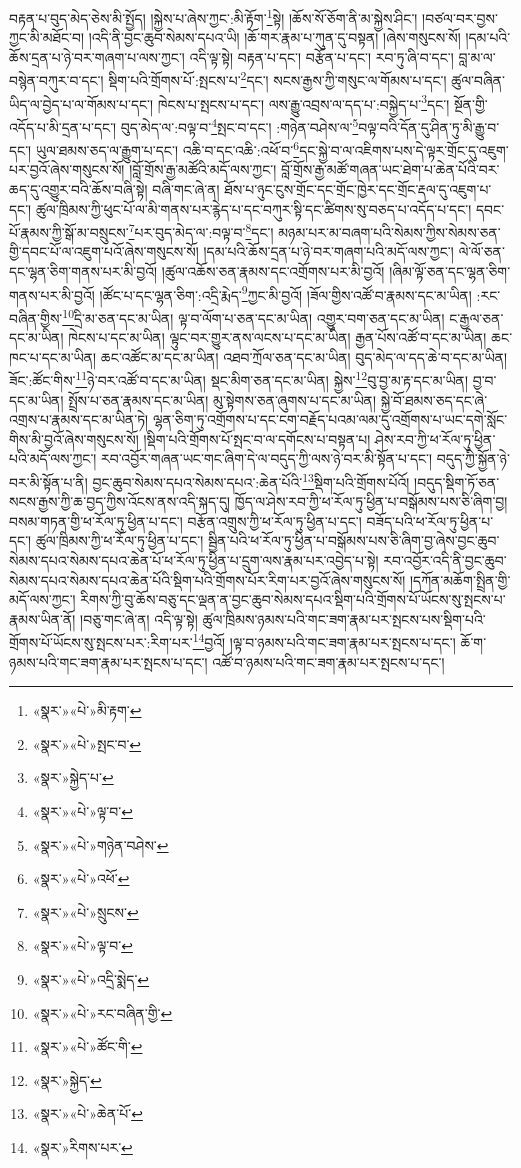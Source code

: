 བརྟན་པ་བུད་མེད་ཅེས་མི་སྤྱོད། །སྐྱེས་པ་ཞེས་ཀྱང་:མི་རྟོག་\footnote{«སྣར་»«པེ་»མི་རྟག་}སྟེ། །ཆོས་སོ་ཅོག་ནི་མ་སྐྱེས་ཤིང་། །བཙལ་བར་བྱས་ཀྱང་མི་མཐོང་བ། །འདི་ནི་བྱང་ཆུབ་སེམས་དཔའ་ཡི། །ཆོ་གར་རྣམ་པ་ཀུན་དུ་བསྟན། །ཞེས་གསུངས་སོ། །དམ་པའི་ཆོས་དྲན་པ་ཉེ་བར་གཞག་པ་ལས་ཀྱང་། འདི་ལྟ་སྟེ། བརྟན་པ་དང་། བརྩོན་པ་དང་། རབ་ཏུ་ཞི་བ་དང་། བླ་མ་ལ་བསྙེན་བཀུར་བ་དང་། སྡིག་པའི་གྲོགས་པོ་:སྤངས་པ་\footnote{«སྣར་»«པེ་»སྤང་བ་}དང་། སངས་རྒྱས་ཀྱི་གསུང་ལ་གོམས་པ་དང་། ཚུལ་བཞིན་ཡིད་ལ་བྱེད་པ་ལ་གོམས་པ་དང་། ཁེངས་པ་སྤངས་པ་དང་། ལས་རྒྱུ་འབྲས་ལ་དད་པ་:བསྐྱེད་པ་\footnote{«སྣར་»སྐྱེད་པ་}དང་། སྔོན་གྱི་འདོད་པ་མི་དྲན་པ་དང་། བུད་མེད་ལ་:བལྟ་བ་\footnote{«སྣར་»«པེ་»ལྟ་བ་}སྤང་བ་དང་། :གཉེན་བཤེས་ལ་\footnote{«སྣར་»«པེ་»གཉེན་བཤེས་}བལྟ་བའི་དོན་དུ་ཤིན་ཏུ་མི་རྒྱུ་བ་དང་། ཡུལ་ཐམས་ཅད་ལ་རྒྱུག་པ་དང་། འཆི་བ་དང་འཆི་:འཕོ་བ་\footnote{«སྣར་»«པེ་»འཕོ་}དང་སྐྱེ་བ་ལ་འཇིགས་པས་དེ་ལྟར་གྲོང་དུ་འཇུག་པར་བྱའོ་ཞེས་གསུངས་སོ། །བློ་གྲོས་རྒྱ་མཚོའི་མདོ་ལས་ཀྱང་། བློ་གྲོས་རྒྱ་མཚོ་གཞན་ཡང་ཐེག་པ་ཆེན་པོའི་བར་ཆད་དུ་འགྱུར་བའི་ཆོས་བཞི་སྟེ། བཞི་གང་ཞེ་ན། ཐོས་པ་ཉུང་ངུས་གྲོང་དང་གྲོང་ཁྱེར་དང་གྲོང་རྡལ་དུ་འཇུག་པ་དང་། ཚུལ་ཁྲིམས་ཀྱི་ཕུང་པོ་ལ་མི་གནས་པར་རྙེད་པ་དང་བཀུར་སྟི་དང་ཚིགས་སུ་བཅད་པ་འདོད་པ་དང་། དབང་པོ་རྣམས་ཀྱི་སྒོ་མ་བསྲུངས་\footnote{«སྣར་»«པེ་»སྲུངས་}པར་བུད་མེད་ལ་:བལྟ་བ་\footnote{«སྣར་»«པེ་»ལྟ་བ་}དང་། མཉམ་པར་མ་བཞག་པའི་སེམས་ཀྱིས་སེམས་ཅན་གྱི་དབང་པོ་ལ་འཇུག་པའོ་ཞེས་གསུངས་སོ། །དམ་པའི་ཆོས་དྲན་པ་ཉེ་བར་གཞག་པའི་མདོ་ལས་ཀྱང་། ལེ་ལོ་ཅན་དང་ལྷན་ཅིག་གནས་པར་མི་བྱའོ། །ཚུལ་འཆོས་ཅན་རྣམས་དང་འགྲོགས་པར་མི་བྱའོ། །ཞིམ་ལྟོ་ཅན་དང་ལྷན་ཅིག་གནས་པར་མི་བྱའོ། །ཚོང་པ་དང་ལྷན་ཅིག་:འདྲི་རྨེད་\footnote{«སྣར་»«པེ་»འདྲི་སྨེད་}ཀྱང་མི་བྱའོ། །ཟོལ་གྱིས་འཚོ་བ་རྣམས་དང་མ་ཡིན། :རང་བཞིན་གྱིས་\footnote{«སྣར་»«པེ་»རང་བཞིན་གྱི་}དྲི་མ་ཅན་དང་མ་ཡིན། ལྟ་བ་ལོག་པ་ཅན་དང་མ་ཡིན། འགྱུར་བག་ཅན་དང་མ་ཡིན། ང་རྒྱལ་ཅན་དང་མ་ཡིན། ཁེངས་པ་དང་མ་ཡིན། ལྟུང་བར་གྱུར་ནས་ལངས་པ་དང་མ་ཡིན། རྒྱན་པོས་འཚོ་བ་དང་མ་ཡིན། ཆང་ཁང་པ་དང་མ་ཡིན། ཆང་འཚོང་མ་དང་མ་ཡིན། འཐབ་ཀྲོལ་ཅན་དང་མ་ཡིན། བུད་མེད་ལ་དད་ཆེ་བ་དང་མ་ཡིན། ཟོང་:ཚོང་གིས་\footnote{«སྣར་»«པེ་»ཚོང་གི་}ཉེ་བར་འཚོ་བ་དང་མ་ཡིན། སྡང་མིག་ཅན་དང་མ་ཡིན། སྐྱེས་\footnote{«སྣར་»སྐྱེད་}བུ་བྱ་མ་རྟ་དང་མ་ཡིན། བྱ་བ་དང་མ་ཡིན། སྤྲོས་པ་ཅན་རྣམས་དང་མ་ཡིན། མུ་སྟེགས་ཅན་ཞུགས་པ་དང་མ་ཡིན། སྐྱེ་བོ་ཐམས་ཅད་དང་ཞེ་འགྲས་པ་རྣམས་དང་མ་ཡིན་ཏེ། ལྷན་ཅིག་ཏུ་འགྲོགས་པ་དང་ངག་བརྗོད་པའམ་ལམ་དུ་འགྲོགས་པ་ཡང་དགེ་སློང་གིས་མི་བྱའོ་ཞེས་གསུངས་སོ། །སྡིག་པའི་གྲོགས་པོ་སྤང་བ་ལ་དགོངས་པ་བསྟན་པ། ཤེས་རབ་ཀྱི་ཕ་རོལ་ཏུ་ཕྱིན་པའི་མདོ་ལས་ཀྱང་། རབ་འབྱོར་གཞན་ཡང་གང་ཞིག་དེ་ལ་བདུད་ཀྱི་ལས་ཉེ་བར་མི་སྟོན་པ་དང་། བདུད་ཀྱི་སྐྱོན་ཉེ་བར་མི་སྟོན་པ་ནི། བྱང་ཆུབ་སེམས་དཔའ་སེམས་དཔའ་:ཆེན་པོའི་\footnote{«སྣར་»«པེ་»ཆེན་པོ་}སྡིག་པའི་གྲོགས་པོའོ། །བདུད་སྡིག་ཏོ་ཅན་སངས་རྒྱས་ཀྱི་ཆ་བྱད་ཀྱིས་འོངས་ནས་འདི་སྐད་དུ། ཁྱོད་ལ་ཤེས་རབ་ཀྱི་ཕ་རོལ་ཏུ་ཕྱིན་པ་བསྒོམས་པས་ཅི་ཞིག་བྱ། བསམ་གཏན་གྱི་ཕ་རོལ་ཏུ་ཕྱིན་པ་དང་། བརྩོན་འགྲུས་ཀྱི་ཕ་རོལ་ཏུ་ཕྱིན་པ་དང་། བཟོད་པའི་ཕ་རོལ་ཏུ་ཕྱིན་པ་དང་། ཚུལ་ཁྲིམས་ཀྱི་ཕ་རོལ་ཏུ་ཕྱིན་པ་དང་། སྦྱིན་པའི་ཕ་རོལ་ཏུ་ཕྱིན་པ་བསྒོམས་པས་ཅི་ཞིག་བྱ་ཞེས་བྱང་ཆུབ་སེམས་དཔའ་སེམས་དཔའ་ཆེན་པོ་ཕ་རོལ་ཏུ་ཕྱིན་པ་དྲུག་ལས་རྣམ་པར་འབྱེད་པ་སྟེ། རབ་འབྱོར་འདི་ནི་བྱང་ཆུབ་སེམས་དཔའ་སེམས་དཔའ་ཆེན་པོའི་སྡིག་པའི་གྲོགས་པོར་རིག་པར་བྱའོ་ཞེས་གསུངས་སོ། །དཀོན་མཆོག་སྤྲིན་གྱི་མདོ་ལས་ཀྱང་། རིགས་ཀྱི་བུ་ཆོས་བཅུ་དང་ལྡན་ན་བྱང་ཆུབ་སེམས་དཔའ་སྡིག་པའི་གྲོགས་པོ་ཡོངས་སུ་སྤངས་པ་རྣམས་ཡིན་ནོ། །བཅུ་གང་ཞེ་ན། འདི་ལྟ་སྟེ། ཚུལ་ཁྲིམས་ཉམས་པའི་གང་ཟག་རྣམ་པར་སྤངས་པས་སྡིག་པའི་གྲོགས་པོ་ཡོངས་སུ་སྤངས་པར་:རིག་པར་\footnote{«སྣར་»རིགས་པར་}བྱའོ། །ལྟ་བ་ཉམས་པའི་གང་ཟག་རྣམ་པར་སྤངས་པ་དང་། ཆོ་ག་ཉམས་པའི་གང་ཟག་རྣམ་པར་སྤངས་པ་དང་། འཚོ་བ་ཉམས་པའི་གང་ཟག་རྣམ་པར་སྤངས་པ་དང་། 